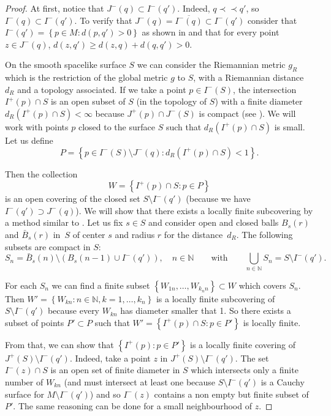 \documentclass[pdftex]{sigma}
\newcommand{\set}[1]{\left\{ {#1} \right\}}
\newcommand{\parenthese}[1]{\left( {#1} \right)}
\newcommand{\setN}{{\mathbb N}}
\newcommand{\precc}{\prec\!\!\prec}
\begin{document}
\begin{proof}
At f\/irst, notice that $J^-(q) \subset  I^-(q')$. Indeed, $q \precc q'$, so $I^-(q) \subset  I^-(q')$. To verify that $J^-(q) = \overline{I^-(q) }\subset  I^-(q')$ consider that $I^-(q') = \set{ p\in M : d(p,q') > 0}$ as shown in \cite{Beem} and that for every point $ z\in J^-(q)$, $d(z,q') \geq d(z,q) + d(q,q') > 0$.

On the smooth spacelike surface $S$ we can consider the Riemannian metric $g_R$ which is the restriction of the global metric $g$ to $S$, with a Riemannian distance $d_R$ and a topology associated. If we take a point $p \in I^-(S)$, the intersection $I^+(p) \cap S$ is an open subset of $S$ (in the topology of $S$) with a f\/inite diameter $d_R(I^+(p) \cap S) < \infty $  because $J^+(p) \cap J^-(S)$ is compact (see \cite{Wald}). We will work with points $p$ closed to the surface $S$ such that $d_R(I^+(p) \cap S)$ is small. Let us def\/ine
\[
P = \set{ p \in I^-(S) \setminus J^-(q) : d_R(I^+(p) \cap S) < 1}.
\]

Then the collection
\[
W = \set{ I^+(p) \cap S : p \in P}
\]
is an open covering of the closed set $S \setminus I^-(q')$ (because we have $I^-(q') \supset J^-(q)$). We will show that there exists a locally f\/inite subcovering by a method similar to \cite{BS03}. Let us f\/ix $s \in S$ and consider open and closed balls $B_s(r)$ and $\bar B_s(r)$ in~$S$ of center $s$ and radius $r$ for the distance~$d_R$. The following subsets are compact in $S$:
\[
S_n = \bar B_s(n) \setminus \parenthese{ B_s(n-1) \cup I^-(q')}, \quad n \in \setN \qquad \text{with} \qquad \bigcup_{n\in \setN} S_n = S \setminus I^-(q').
\]

For each $S_n$ we can f\/ind a f\/inite subset $\set{W_{1n}, \dots, W_{k_n n}} \subset W$ which covers $S_n$. Then $W' = \set{W_{kn} : n\in \setN , k = 1, \dots, k_n}$ is a locally f\/inite subcovering of $S \setminus I^-(q')$ because every $W_{kn}$ has diameter smaller that 1. So there exists a subset of points $P' \subset P$ such that $W' = \set{ I^+(p) \cap S : p \in P'}$ is locally f\/inite.

From that, we can show that $\set{I^+(p) : p \in P'}$ is a locally f\/inite covering of  $J^+(S) \setminus I^-(q')$. Indeed, take a point $z$ in $J^+(S) \setminus I^-(q')$. The set $I^-(z) \cap S$ is an open set of f\/inite diameter in $S$ which intersects only a f\/inite number of $W_{kn}$ (and must intersect at least one because $S \setminus I^-(q')$ is a Cauchy surface for $M \setminus I^-(q')$) and so $I^-(z)$ contains a non empty but f\/inite subset of $P'$. The same reasoning can be done for a small neighbourhood of $z$.


\end{proof}
\end{document}
